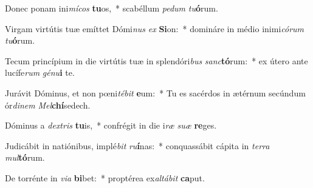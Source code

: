 \item Donec ponam ini\textit{mí}\textit{cos} \textbf{tu}os,~* scabéllum \textit{pe}\textit{dum} \textit{tu}\textbf{ó}rum.
\item Virgam virtútis tuæ emíttet Dómi\textit{nus} \textit{ex} \textbf{Si}on:~* domináre in médio inimi\textit{có}\textit{rum} \textit{tu}\textbf{ó}rum.
\item Tecum princípium in die virtútis tuæ in splendóri\textit{bus} \textit{sanc}\textbf{tó}rum:~* ex útero ante lucífe\textit{rum} \textit{gé}\textit{nu}\textbf{i} te.
\item Jurávit Dóminus, et non pœni\textit{té}\textit{bit} \textbf{e}um:~* Tu es sacérdos in ætérnum secúndum ór\textit{di}\textit{nem} \textit{Mel}\textbf{chí}sedech.
\item Dóminus a \textit{dex}\textit{tris} \textbf{tu}is,~* confrégit in die i\textit{ræ} \textit{su}\textit{æ} \textbf{re}ges.
\item Judicábit in natiónibus, implé\textit{bit} \textit{ru}\textbf{í}nas:~* conquassábit cápita in \textit{ter}\textit{ra} \textit{mul}\textbf{tó}rum.
\item De torrénte in \textit{vi}\textit{a} \textbf{bi}bet:~* proptérea ex\textit{al}\textit{tá}\textit{bit} \textbf{ca}put.
